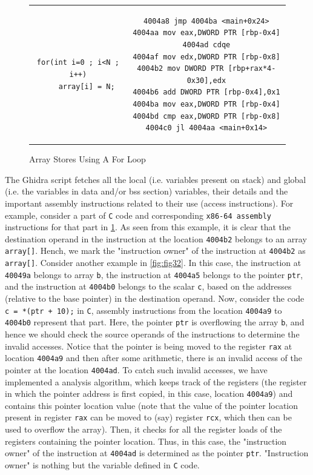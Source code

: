 \begin{figure}
\begin{centering}
\begin{tabular}{ c | c }
\begin{lstlisting}
for(int i=0 ; i<N ; i++)
    array[i] = N;
\end{lstlisting}
&
\begin{lstlisting}
4004a8 jmp 4004ba <main+0x24>
4004aa mov eax,DWORD PTR [rbp-0x4]
4004ad cdqe
4004af mov edx,DWORD PTR [rbp-0x8]
4004b2 mov DWORD PTR [rbp+rax*4-0x30],edx
4004b6 add DWORD PTR [rbp-0x4],0x1
4004ba mov eax,DWORD PTR [rbp-0x4]
4004bd cmp eax,DWORD PTR [rbp-0x8]
4004c0 jl 4004aa <main+0x14>
\end{lstlisting}
\end{tabular}
\caption{Array Stores Using A For Loop\label{fig:fig31}}
\par\end{centering}
\end{figure}

The Ghidra script fetches all the local (i.e. variables present on stack) and global (i.e. the variables in data and/or bss section) variables, their details and the important assembly instructions related to their use (access instructions). For example, consider a part of \texttt{C} code and corresponding \texttt{x86-64 assembly} instructions for that part in \cref{fig:fig31}. As seen from this example, it is clear that the destination operand in the instruction at the location \texttt{4004b2} belongs to an array \texttt{array[]}. Hench, we mark the "instruction owner" of the instruction at \texttt{4004b2} as \texttt{array[]}. Consider another example in \cref{fig:fig32}. In this case, the instruction at \texttt{40049a} belongs to array \texttt{b}, the instruction at \texttt{4004a5} belongs to the pointer \texttt{ptr}, and the instruction at \texttt{4004b0} belongs to the scalar \texttt{c}, based on the addresses (relative to the base pointer) in the destination operand. Now, consider the code \texttt{c = *(ptr + 10);} in \texttt{C}, assembly instructions from the location \texttt{4004a9} to \texttt{4004b0} represent that part. Here, the pointer \texttt{ptr} is overflowing the array \texttt{b}, and hence we should check the source operands of the instructions to determine the invalid accesses. Notice that the pointer is being moved to the register \texttt{rax} at location \texttt{4004a9} and then after some arithmetic, there is an invalid access of the pointer at the location \texttt{4004ad}. To catch such invalid accesses, we have implemented a analysis algorithm, which keeps track of the registers (the register in which the pointer address is first copied, in this case, location \texttt{4004a9}) and contains this pointer location value (note that the value of the pointer location present in register \texttt{rax} can be moved to (say) register \texttt{rcx}, which then can be used to overflow the array). Then, it checks for all the register loads of the registers containing the pointer location. Thus, in this case, the "instruction owner" of the instruction at \texttt{4004ad} is determined as the pointer \texttt{ptr}. "Instruction owner" is nothing but the variable defined in \texttt{C} code.

